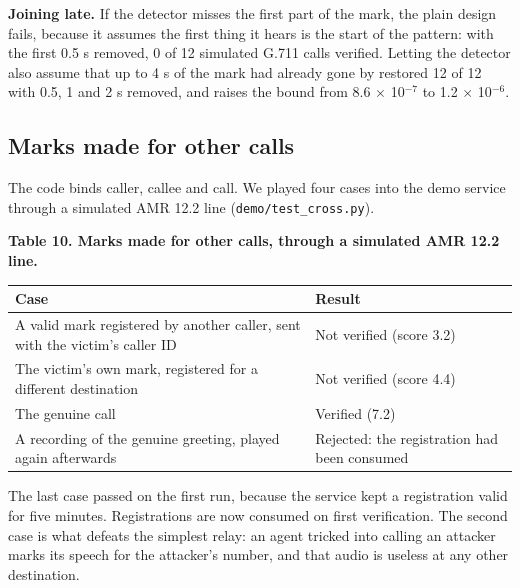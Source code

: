 \documentclass[10pt,a4paper]{article}
\begin{document}
\textbf{Joining late.} If the detector misses the first part of the mark, the plain design fails, because it assumes the first thing it hears is the start of the pattern: with the first 0.5 s removed, 0 of 12 simulated G.711 calls verified. Letting the detector also assume that up to 4 s of the mark had already gone by restored 12 of 12 with 0.5, 1 and 2 s removed, and raises the bound from 8.6 $\times$ 10$^{-7}$ to 1.2 $\times$ 10$^{-6}$.

\subsection{Marks made for other calls}\label{s-6-10}

The code binds caller, callee and call. We played four cases into the demo service through a simulated AMR 12.2 line (\texttt{demo/test\_cross.py}).

\begin{center}\small {}\label{t-10}\textbf{Table 10. Marks made for other calls, through a simulated AMR 12.2 line.}\end{center}

{\def\LTcaptype{none} %
\begin{longtable}[]{@{}
  >{\raggedright\arraybackslash}p{}
  >{\raggedright\arraybackslash}p{}@{}}
\toprule\noalign{}
\begin{minipage}[b]{\linewidth}\raggedright
Case
\end{minipage} & \begin{minipage}[b]{\linewidth}\raggedright
Result
\end{minipage} \\
\midrule\noalign{}
\endhead
\bottomrule\noalign{}
\endlastfoot
A valid mark registered by another caller, sent with the victim's caller ID & Not verified (score 3.2) \\
The victim's own mark, registered for a different destination & Not verified (score 4.4) \\
The genuine call & Verified (7.2) \\
A recording of the genuine greeting, played again afterwards & Rejected: the registration had been consumed \\
\end{longtable}
}

The last case passed on the first run, because the service kept a registration valid for five minutes. Registrations are now consumed on first verification. The second case is what defeats the simplest relay: an agent tricked into calling an attacker marks its speech for the attacker's number, and that audio is useless at any other destination.
\end{document}
